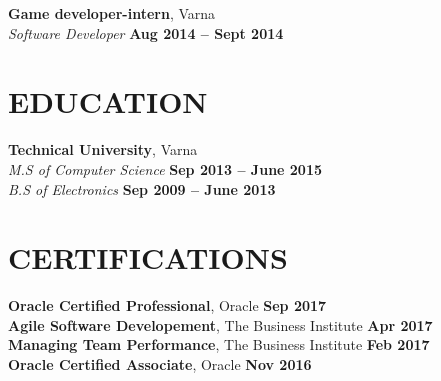 \documentclass[margin,line]{resume}
\begin{document}
\begin{resume}
	\textbf{\listing Game developer{-}intern}, Varna \vspace{2mm}\\\vspace{1mm}%
    \textsl{Software Developer} \hfill \textbf{Aug 2014 -- Sept 2014}
    

\sectionline

    \section{\mysidestyle \textbf{\large{E}\small{DUCATION}}}

    \textbf{\listing Technical University}, Varna \vspace{2mm}\\\vspace{1mm}%
    \textsl{M.S of Computer Science} \hfill \textbf{ Sep 2013 -- June 2015}\\
    \textsl{B.S of Electronics} \hfill \textbf{ Sep 2009 -- June 2013}\\

\sectionline

    \section{\mysidestyle \textbf{\large{C}\small{ERTIFICATIONS}}}

    \textbf{Oracle Certified Professional}, Oracle \hfill \textbf{Sep 2017} \vspace{2mm}\\\vspace{1mm}%
    \textbf{Agile Software Developement}, The Business Institute \hfill \textbf{Apr 2017} \vspace{2mm}\\\vspace{1mm}%
    \textbf{Managing Team Performance}, The Business Institute \hfill \textbf{Feb 2017} \vspace{2mm}\\\vspace{1mm}%
    \textbf{Oracle Certified Associate}, Oracle \hfill \textbf{Nov 2016} \vspace{2mm}\\\vspace{1mm}%

\end{resume}
\end{document}
